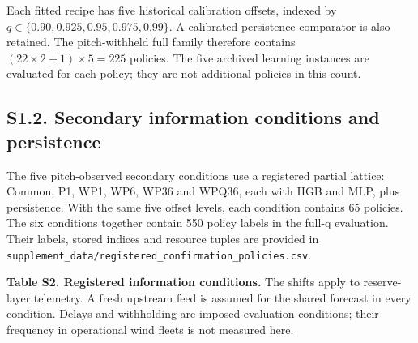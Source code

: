 \documentclass[
  british,
  11pt,
]{article}
\begin{document}
Each fitted recipe has five historical calibration offsets, indexed by
\(q\in\{0.90,0.925,0.95,0.975,0.99\}\). A calibrated persistence
comparator is also retained. The pitch-withheld full family therefore
contains \((22\times2+1)\times5=225\) policies. The five archived
learning instances are evaluated for each policy; they are not
additional policies in this count.

\subsection{S1.2. Secondary information conditions and
persistence}\label{s1.2.-secondary-information-conditions-and-persistence}

The five pitch-observed secondary conditions use a registered partial
lattice: Common, P1, WP1, WP6, WP36 and WPQ36, each with HGB and MLP,
plus persistence. With the same five offset levels, each condition
contains 65 policies. The six conditions together contain 550 policy
labels in the full-q evaluation. Their labels, stored indices and
resource tuples are provided in
\texttt{supplement\_data/registered\_confirmation\_policies.csv}.

\textbf{Table S2. Registered information conditions.} The shifts apply
to reserve-layer telemetry. A fresh upstream feed is assumed for the
shared forecast in every condition. Delays and withholding are imposed
evaluation conditions; their frequency in operational wind fleets is not
measured here.
\end{document}
